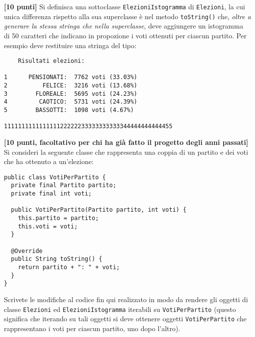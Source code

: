 \documentclass{article}[10pt]
\newcounter{esnu}
\newenvironment{esercizio}{\medskip \noindent {\bf Esercizio\addtocounter{esnu}{1} \arabic{esnu}}}{}
\begin{document}
\begin{esercizio}
  \textbf{[10 punti]}
  Si definisca una sottoclasse \texttt{ElezioniIstogramma} di
  \texttt{Elezioni}, la cui unica differenza rispetto alla sua superclasse
  \`e nel metodo \texttt{toString()} che, \emph{oltre a generare la stessa stringa
  che nella superclasse}, deve aggiungere un istogramma di 50 caratteri
  che indicano in propozione i voti ottenuti per ciascun partito. Per esempio
  deve restituire una stringa del tipo:

  {\small\begin{verbatim}
    Risultati elezioni:

1      PENSIONATI:  7762 voti (33.03%)
2          FELICE:  3216 voti (13.68%)
3        FLOREALE:  5695 voti (24.23%)
4         CAOTICO:  5731 voti (24.39%)
5        BASSOTTI:  1098 voti (4.67%)

111111111111111122222233333333333344444444444455
  \end{verbatim}}

\end{esercizio}

\begin{esercizio}
  \textbf{[10 punti, facoltativo per chi ha gi\`a fatto il progetto degli anni passati]}
  Si consideri la seguente classe che rappresenta una coppia di un partito e dei voti
  che ha ottenuto a un'elezione:

  {\small\begin{verbatim}
public class VotiPerPartito {
  private final Partito partito;
  private final int voti;

  public VotiPerPartito(Partito partito, int voti) {
    this.partito = partito;
    this.voti = voti;
  }

  @Override
  public String toString() {
    return partito + ": " + voti;
  }
}
  \end{verbatim}}

  \noindent
  Scrivete le modifiche al codice fin qui realizzato in modo da rendere gli oggetti
  di classe \texttt{Elezioni} ed \texttt{ElezioniIstogramma} iterabili su
  \texttt{VotiPerPartito} (questo significa che iterando
  su tali oggetti si deve ottenere oggetti \texttt{VotiPerPartito}
  che rappresentano i voti per ciascun partito, uno dopo l'altro).
  
\end{esercizio}
\end{document}
